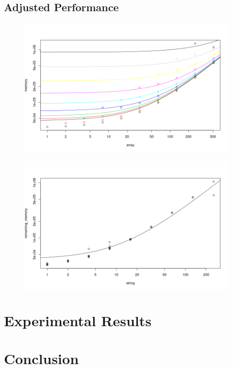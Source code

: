 \documentclass{article}
\begin{document}
\subsection{Adjusted Performance}

\begin{figure}
  \centering
  \includegraphics[width=\textwidth]{../proof_of_concept/prediction1.png}
  \caption{}
  \label{}
\end{figure}

\begin{figure}
  \centering
  \includegraphics[width=\textwidth]{../proof_of_concept/prediction2.png}
  \caption{}
  \label{}
\end{figure}

\section{Experimental Results}

\section{Conclusion}
\end{document}
